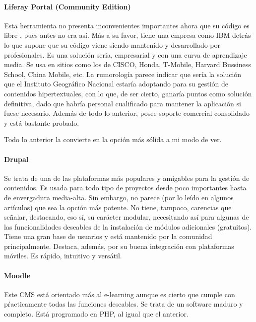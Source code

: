 \paragraph{Liferay Portal (Community Edition)}
\par Esta herramienta no presenta inconvenientes importantes ahora que su código es libre \cite{references:liferaylicense}, pues antes no era así. Más a su favor, tiene una empresa como IBM detrás lo que supone que su código viene siendo mantenido y desarrollado por profesionales. Es una solución seria, empresarial y con una curva de aprendizaje media. Se usa en sitios como los de CISCO, Honda, T-Mobile, Harvard Bussiness School, China Mobile, etc.
La rumorología parece indicar que sería la solución que el Instituto Geográfico Nacional estaría adoptando para su gestión de contenidos hipertextuales, con lo que, de ser cierto, ganaría puntos como solución definitiva, dado que habría personal cualificado para mantener la aplicación si fuese necesario.
Además de todo lo anterior, posee soporte comercial consolidado y está bastante probado.
\par Todo lo anterior la convierte en la opción más sólida a mi modo de ver.

\paragraph{Drupal}
\par Se trata de una de las plataformas más populares y amigables para la gestión de contenidos. Es usada para todo tipo de proyectos desde poco importantes hasta de envergadura media-alta. Sin embargo, no parece (por lo leído en algunos artículos) que sea la opción más potente.
No tiene, tampoco, carencias que señalar, destacando, eso sí, su carácter modular, necesitando así para algunas de las funcionalidades deseables de la instalación de módulos adicionales (gratuitos). Tiene una gran base de usuarios y está mantenido por la comunidad principalmente. Destaca, además, por su buena integración con plataformas móviles.
Es rápido, intuitivo y versátil.

\paragraph{Moodle}
\par Este CMS está orientado más al e-learning aunque es cierto que cumple con pŕacticamente todas las funciones deseables.
Se trata de un software maduro y completo.
Está programado en PHP, al igual que el anterior.

